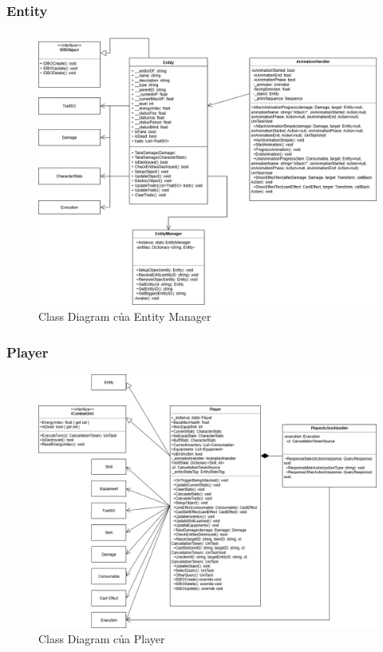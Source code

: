 \subsubsection{Entity}
\begin{figure}[H]
	\centering
	\includegraphics[width=\textwidth]{Images/CD/EntityCD.drawio.png}
	\vspace{0.5cm}
	\caption{Class Diagram của Entity Manager}
\end{figure}
\subsubsection{Player}
\begin{figure}[H]
	\centering
	\includegraphics[width=\textwidth]{Images/CD/PlayerCD.drawio.png}
	\vspace{0.5cm}
	\caption{Class Diagram của Player}
\end{figure}
